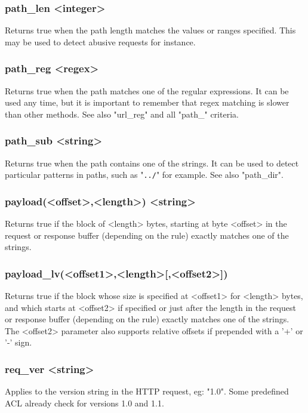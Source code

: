 \subsubsection[path\_len]{path\_len <integer>}
  Returns true when the path length matches the values or ranges specified.
  This may be used to detect abusive requests for instance.

\subsubsection[path\_reg]{path\_reg <regex>}
  Returns true when the path matches one of the regular expressions. It can be
  used any time, but it is important to remember that regex matching is slower
  than other methods. See also "url\_reg" and all "path\_" criteria.

\subsubsection[path\_sub]{path\_sub <string>}
  Returns true when the path contains one of the strings. It can be used to
  detect particular patterns in paths, such as "\verb|../|" for example. See also
  "path\_dir".

\subsubsection[payload]{payload(<offset>,<length>) <string>}
  Returns true if the block of <length> bytes, starting at byte <offset> in the
  request or response buffer (depending on the rule) exactly matches one of the
  strings.

\subsubsection[payload\_lv]{payload\_lv(<offset1>,<length>[,<offset2>])}
  Returns true if the block whose size is specified at <offset1> for <length>
  bytes, and which starts at <offset2> if specified or just after the length in
  the request or response buffer (depending on the rule) exactly matches one of
  the strings. The <offset2> parameter also supports relative offsets if
  prepended with a '+' or '-' sign.

\subsubsection[req\_ver]{req\_ver <string>}
  Applies to the version string in the HTTP request, eg: "1.0". Some predefined
  ACL already check for versions 1.0 and 1.1.

